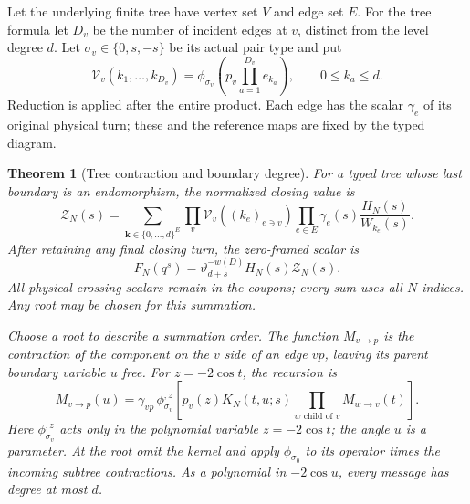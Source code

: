 \documentclass[11pt]{article}
\numberwithin{equation}{section}
\newtheorem{theorem}{Theorem}[section]
\theoremstyle{definition}\newtheorem{definition}[theorem]{Definition}
\theoremstyle{remark}\newtheorem{remark}[theorem]{Remark}
\begin{document}
Let the underlying finite tree have vertex set $V$ and edge set $E$.
For the tree formula let $D_v$ be the number of incident edges at
$v$, distinct from the level degree $d$. Let
$\sigma_v\in\{0,s,-s\}$ be its actual pair type and put
\begin{equation}\label{mt:vertex}
 \mathcal V_v(k_1,\ldots,k_{D_v})=
 \phi_{\sigma_v}\left(p_v\prod_{a=1}^{D_v}e_{k_a}\right),
 \qquad 0\le k_a\le d.
\end{equation}
Reduction is applied after the entire product. Each edge has the
scalar $\gamma_e$ of its original physical turn; these and the
reference maps are fixed by the typed diagram.

\begin{theorem}[Tree contraction and boundary degree]\label{mt:tree}
For a typed tree whose last boundary is an endomorphism, the
normalized closing value is
\begin{equation}\label{mt:network}
 \mathcal Z_N(s)=\sum_{\boldsymbol k\in\{0,\ldots,d\}^{E}}
   \prod_v\mathcal V_v((k_e)_{e\ni v})
   \prod_{e\in E}\gamma_e(s)\frac{H_N(s)}{W_{k_e}(s)}.
\end{equation}
After retaining any final closing turn, the zero-framed scalar is
\begin{equation}\label{mt:closing}
 F_N(q^s)=\vartheta_{d+s}^{-w(D)}H_N(s)\mathcal Z_N(s).
\end{equation}
All physical crossing scalars remain in the coupons; every sum
uses all $N$ indices. Any root may be chosen for this summation.

Choose a root to describe a summation order. The function
$M_{v\to p}$ is the contraction of the component on the $v$ side of
an edge $vp$, leaving its parent boundary variable $u$ free. For
$z=-2\cos t$, the recursion is
\begin{equation}\label{mt:message}
 M_{v\to p}(u)=\gamma_{vp}\,
 \phi_{\sigma_v}^{,z}\left[
 p_v(z)K_N(t,u;s)\prod_{w\text{ child of }v}M_{w\to v}(t)\right].
\end{equation}
Here $\phi_{\sigma_v}^{,z}$ acts only in the polynomial variable
$z=-2\cos t$; the angle $u$ is a parameter. At the root omit the
kernel and apply $\phi_{\sigma_0}$ to its operator times the incoming
subtree contractions. As a polynomial in
$-2\cos u$, every message has degree at most $d$.
\end{theorem}
\end{document}

